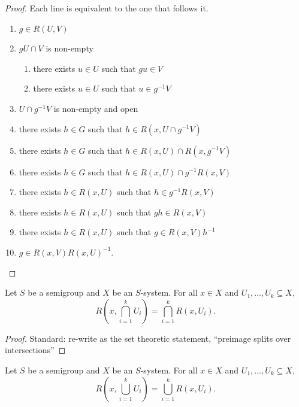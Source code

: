 \begin{proof}
\leanok{}
    Each line is equivalent to the one that follows it.
    \begin{enumerate}
        \item $g \in R(U,V)$
        \item $gU \cap V$ is non-empty
        \begin{enumerate}
            \item there exists $u \in U$ such that $gu \in V$
            \item there exists $u \in U$ such that $u \in g^{-1} V$
        \end{enumerate}
        \item $U \cap g^{-1} V$ is non-empty and open
        \item there exists $h \in G$ such that $h \in R(x, U \cap g^{-1}V)$
        \item there exists $h \in G$ such that $h \in R(x,U) \cap R(x,g^{-1}V)$
        \item there exists $h \in G$ such that $h \in R(x,U) \cap g^{-1} R(x,V)$
        \item there exists $h \in R(x,U)$ such that $h \in g^{-1} R(x,V)$
        \item there exists $h \in R(x,U)$ such that $gh \in R(x,V)$
        \item there exists $h \in R(x,U)$ such that $g \in R(x,V) h^{-1}$
        \item $g \in R(x,V) R(x,U)^{-1}$.
    \end{enumerate}
\end{proof}

\begin{lemma}
    \label{lemma_return_to_intersection}
    \leanok{}
    Let $S$ be a semigroup and $X$ be an $S$-system.  For all $x \in X$ and $U_1, \ldots, U_k \subseteq X$,
    \[R\left(x, \bigcap_{i=1}^k U_i \right) = \bigcap_{i=1}^k R(x,U_i).\]
\end{lemma}

\begin{proof}
\leanok{}
    Standard: re-write as the set theoretic statement, ``preimage splits over intersections''
\end{proof}

\begin{lemma}
    \label{lemma_return_to_union}
    \leanok{}
    Let $S$ be a semigroup and $X$ be an $S$-system.  For all $x \in X$ and $U_1, \ldots, U_k \subseteq X$,
    \[R\left(x, \bigcup_{i=1}^k U_i \right) = \bigcup_{i=1}^k R(x,U_i).\]
\end{lemma}

